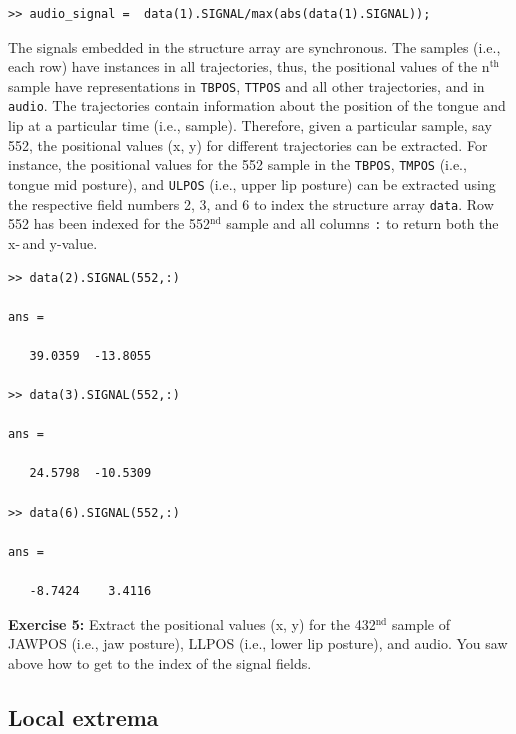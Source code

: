 \documentclass[a4paper, 12pt]{article}
\begin{document}
\begin{verbatim}
>> audio_signal =  data(1).SIGNAL/max(abs(data(1).SIGNAL));
\end{verbatim}

The signals embedded in the structure array are synchronous. The samples (i.e., each row) have instances in all trajectories, thus, the positional values of the n$^{\text{th}}$ sample have representations in \texttt{TBPOS}, \texttt{TTPOS} and all other trajectories, and in \texttt{audio}. The trajectories contain information about the position of the tongue and lip at a particular time (i.e., sample). Therefore, given a particular sample, say 552, the positional values (x, y) for different trajectories can be extracted. For instance, the positional values for the 552 sample in the \texttt{TBPOS}, \texttt{TMPOS} (i.e., tongue mid posture), and \texttt{ULPOS} (i.e., upper lip posture) can be extracted using the respective field numbers 2, 3, and 6 to index the structure array \texttt{data}. Row 552 has been indexed for the 552$^{\text{nd}}$ sample and all columns \texttt{:} to return both the x-\,and y-value.


\begin{verbatim}
>> data(2).SIGNAL(552,:)

ans =

   39.0359  -13.8055

>> data(3).SIGNAL(552,:)

ans =

   24.5798  -10.5309

>> data(6).SIGNAL(552,:)

ans =

   -8.7424    3.4116
\end{verbatim}

\noindent\textbf{Exercise 5:} Extract the positional values (x, y) for the 432$^{\text{nd}}$ sample of JAWPOS (i.e., jaw posture), LLPOS (i.e., lower lip posture), and audio. You saw above how to get to the index of the signal fields.\par\smallskip


\subsection{Local extrema}\label{locext}
\end{document}
